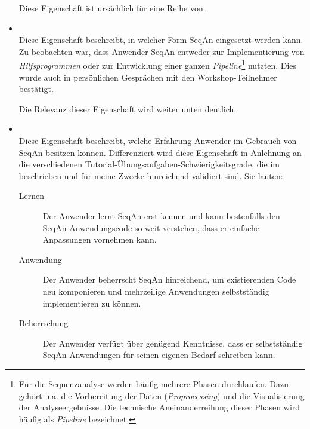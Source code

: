 \begin{itemize}
  Diese Eigenschaft ist ursächlich für eine Reihe von .
  
  \item[\codebullet{apiua://code/-9223372036854774938}] \textbf{} \\
  Diese Eigenschaft beschreibt, in welcher Form SeqAn eingesetzt werden kann. Zu beobachten war, dass Anwender SeqAn entweder zur Implementierung von \textit{Hilfsprogrammen} oder zur Entwicklung einer ganzen \textit{Pipeline}\footnote{Für die Sequenzanalyse werden häufig mehrere Phasen durchlaufen. Dazu gehört u.a. die Vorbereitung der Daten (\textit{Proprocessing}) und die Visualisierung der Analyseergebnisse. Die technische Aneinanderreihung dieser Phasen wird häufig als \textit{Pipeline} bezeichnet.} nutzten. Dies wurde auch in persönlichen Gesprächen mit den Workshop-Teilnehmer bestätigt.%
  
  Die Relevanz dieser Eigenschaft wird weiter unten deutlich.
  
   
  
  \item[\codebullet{apiua://code/-9223372036854775446}] \textbf{} \\
  Diese Eigenschaft beschreibt, welche Erfahrung Anwender im Gebrauch von SeqAn besitzen können. Differenziert wird diese Eigenschaft in Anlehnung an die verschiedenen Tutorial-Übungsaufgaben-Schwierigkeitsgrade, die im  beschrieben und für meine Zwecke hinreichend validiert sind. Sie lauten:
  
  \begin{description}
    \item[Lernen] Der Anwender lernt SeqAn erst kennen und kann bestenfalls den SeqAn-Anwendungscode so weit verstehen, dass er einfache Anpassungen vornehmen kann. 
    \item[Anwendung] Der Anwender beherrscht SeqAn hinreichend, um existierenden Code neu komponieren und mehrzeilige Anwendungen selbstständig implementieren zu können.
    \item[Beherrschung] Der Anwender verfügt über genügend Kenntnisse, dass er selbstständig SeqAn-Anwendungen für seinen eigenen Bedarf schreiben kann. 
  \end{description}
  

\end{itemize}
